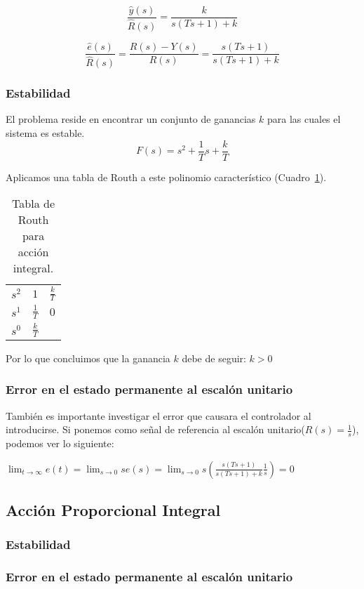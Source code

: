         \begin{equation}
            \frac{\hat{y}(s)}{\hat{R}(s)} = \frac{k}{s(Ts + 1) + k}
        \end{equation}

        \begin{equation}
            \frac{\hat{e}(s)}{\hat{R}(s)} = \frac{R(s) - Y(s)}{R(s)} = \frac{s(Ts + 1)}{s(Ts + 1) + k}
        \end{equation}

        \subsubsection{Estabilidad}
            El problema reside en encontrar un conjunto de ganancias $k$ para las cuales el sistema es estable.
            \begin{equation}
                F(s) = s^2 + \frac{1}{T} s + \frac{k}{T}
            \end{equation}

            Aplicamos una tabla de Routh a este polinomio característico (Cuadro~\ref{tab:AccionIntegral}).

            \begin{table}[htbp]
                \centering
                \begin{tabular}{c|c c}
                $s^2$ & $1$ & $\frac{k}{T}$ \\
                $s^1$ & $\frac{1}{T}$ & $0$ \\
                $s^0$ & $\frac{k}{T}$
                \end{tabular}
                \caption{\label{tab:AccionIntegral}Tabla de Routh para acción integral.}
            \end{table}

            Por lo que concluimos que la ganancia $k$ debe de seguir: $k>0$

        \subsubsection{Error en el estado permanente al escalón unitario}
            También es importante investigar el error que causara el controlador al introducirse. Si ponemos como señal de referencia al escalón unitario($R(s) = \frac{1}{s}$), podemos ver lo siguiente:

            \begin{math}
                \displaystyle \lim_{t \to \infty} e(t) = \lim_{s \to 0} s e(s) = \lim_{s \to 0} s \left(\frac{s(Ts + 1)}{s(Ts + 1) + k} \frac{1}{s}\right) = 0
            \end{math}

    \subsection{Acción Proporcional Integral}
        \subsubsection{Estabilidad}
        \subsubsection{Error en el estado permanente al escalón unitario}
